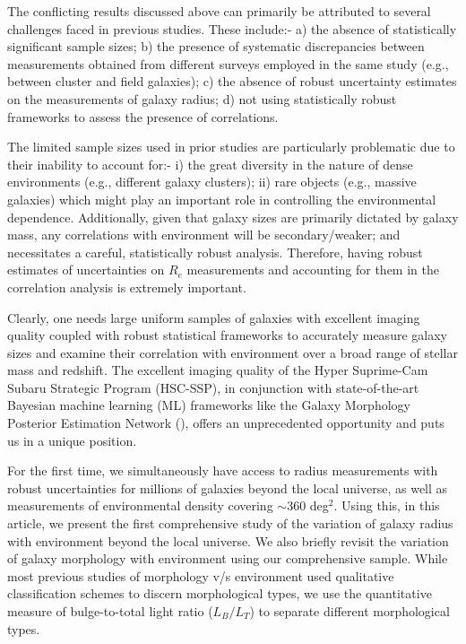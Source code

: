The conflicting results discussed above can primarily be attributed to several challenges faced in previous studies. These include:- a) the absence of statistically significant sample sizes; b) the presence of systematic discrepancies between measurements obtained from different surveys employed in the same study (e.g., between cluster and field galaxies); c) the absence of robust uncertainty estimates on the measurements of galaxy radius; d) not using statistically robust frameworks to assess the presence of correlations. 

The limited sample sizes used in prior studies are particularly problematic due to their inability to account for:- i) the great diversity in the nature of dense environments (e.g., different galaxy clusters); ii) rare objects (e.g., massive galaxies) which might play an important role in controlling the environmental dependence. Additionally, given that galaxy sizes are primarily dictated by galaxy mass, any correlations with environment will be secondary/weaker; and necessitates a careful, statistically robust analysis. Therefore, having robust estimates of uncertainties on $R_e$ measurements and accounting for them in the correlation analysis is extremely important.  

Clearly, one needs large uniform samples of galaxies with excellent imaging quality coupled with robust statistical frameworks to accurately measure galaxy sizes and examine their correlation with environment over a broad range of stellar mass and redshift. The excellent imaging quality of the Hyper Suprime-Cam Subaru Strategic Program (HSC-SSP), in conjunction with state-of-the-art Bayesian machine learning (ML) frameworks like the Galaxy Morphology Posterior Estimation Network (\gampen{}), offers an unprecedented opportunity and puts us in a unique position. 

For the first time, we simultaneously have access to radius measurements with robust uncertainties for millions of galaxies beyond the local universe, as well as measurements of environmental density covering $\sim360$ deg$^2$. Using this, in this article, we present the  first comprehensive study of the variation of galaxy radius with environment beyond the local universe. We also briefly revisit the variation of galaxy morphology with environment using our comprehensive sample. While most previous studies of morphology v/s environment used qualitative classification schemes to discern morphological types, we use the quantitative measure of bulge-to-total light ratio ($L_B/L_T$) to separate different morphological types. 

